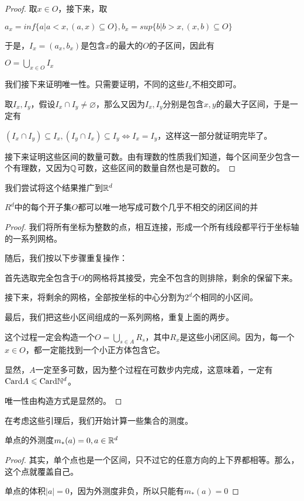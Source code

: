 \documentclass[12pt, a4paper, oneside, UTF8]{ctexbook}
\begin{document}
			\begin{proof}
				取$x \in O$，接下来，取
				
				$a_x = inf \{a| a<x,(a,x) \subseteq O\},b_x = sup \{b|b>x,(x,b) \subseteq O\}$
				
				于是，$I_x = (a_x,b_x)$是包含$x$的最大的$O$的子区间，因此有
				
				$O = \bigcup_{x \in O} I_x$
				
				我们接下来证明唯一性。只需要证明，不同的这些$I_x$不相交即可。
				
				取$I_x,I_y$，假设$I_x \cap I_y \neq \varnothing$，那么又因为$I_x,I_y$分别是包含$x,y$的最大子区间，于是一定有
				
				$(I_x \cap I_y) \subseteq I_x,(I_y \cap I_x) \subseteq I_y \Leftrightarrow I_x = I_y$，这样这一部分就证明完毕了。
				
				接下来证明这些区间的数量可数。由有理数的性质我们知道，每个区间至少包含一个有理数，又因为$\mathbb{Q}$可数，这些区间的数量自然也是可数的。
			\end{proof}
			我们尝试将这个结果推广到$\mathbb{R}^d$
			\begin{them}{}{}
				$R^d$中的每个开子集$O$都可以唯一地写成可数个几乎不相交的闭区间的并
			\end{them}
			\begin{proof}
				我们将所有坐标为整数的点，相互连接，形成一个所有线段都平行于坐标轴的一系列网格。
				
				随后，我们按以下步骤重复操作：
				
				首先选取完全包含于$O$的网格将其接受，完全不包含的则排除，剩余的保留下来。
				
				接下来，将剩余的网格，全部按坐标的中心分割为$2^d$个相同的小区间。
				
				最后，我们把这些小区间组成的一系列网格，重复上面的两步。
				
				这个过程一定会构造一个$O = \bigcup_{s \in A} R_s$，其中$R_x$是这些小闭区间。因为，每一个$x \in O$，都一定能找到一个小正方体包含它。
				
				显然，$A$一定至多可数，因为整个过程在可数步内完成，这意味着，一定有$\text{Card}A \leqslant \text{Card}\mathbb{N}^d$。
				
				唯一性由构造方式是显然的。
			\end{proof}
			在考虑这些引理后，我们开始计算一些集合的测度。
			\begin{example}
				单点的外测度$m_*(a)=0,a\in \mathbb{R}^d$
			\end{example}
			\begin{proof}
				其实，单个点也是一个区间，只不过它的任意方向的上下界都相等。那么，这个点就覆盖自己。
				
				单点的体积$|a|=0$，因为外测度非负，所以只能有$m_*(a)=0$
			\end{proof}
\end{document}
